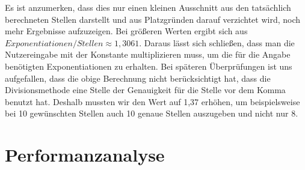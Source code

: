 \documentclass[course=erap]{aspdoc}
\begin{document}
    Es ist anzumerken, dass dies nur einen kleinen Ausschnitt aus den tatsächlich berechneten Stellen darstellt und aus Platzgründen darauf verzichtet wird, noch mehr Ergebnisse aufzuzeigen. Bei größeren Werten ergibt sich aus \begin{math}
                                                                                                                                                                                                                                       Exponentiationen/Stellen  \approx 1,3061
    \end{math}. Daraus lässt sich schließen, dass man die Nutzereingabe mit der Konstante multiplizieren muss, um die für die Angabe benötigten Exponentiationen zu erhalten. Bei späteren Überprüfungen ist uns aufgefallen, dass die obige Berechnung nicht berücksichtigt hat, dass die Divisionsmethode eine Stelle der Genauigkeit für die Stelle vor dem Komma benutzt hat. Deshalb mussten wir den Wert auf 1,37 erhöhen, um beispielsweise bei 10 gewünschten Stellen auch 10 genaue Stellen auszugeben und nicht nur 8.
    \section{Performanzanalyse}\label{Performance}
\end{document}
